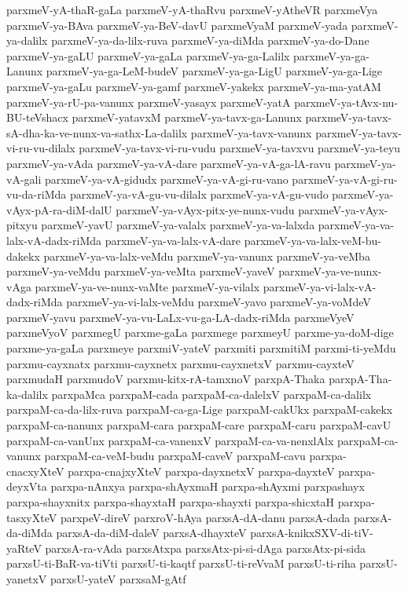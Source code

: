 {parxmeV-yA-thaR-gaLa
parxmeV-yA-thaRvu
parxmeV-yAtheVR
parxmeVya
parxmeV-ya-BAva
parxmeV-ya-BeV-davU
parxmeVyaM
parxmeV-yada
parxmeV-ya-dalilx
parxmeV-ya-da-lilx-ruva
parxmeV-ya-diMda
parxmeV-ya-do-Dane
parxmeV-ya-gaLU
parxmeV-ya-gaLa
parxmeV-ya-ga-Lalilx
parxmeV-ya-ga-Lanunx
parxmeV-ya-ga-LeM-budeV
parxmeV-ya-ga-LigU
parxmeV-ya-ga-Lige
parxmeV-ya-gaLu
parxmeV-ya-gamf
parxmeV-yakekx
parxmeV-ya-ma-yatAM
parxmeV-ya-rU-pa-vanunx
parxmeV-yasayx
parxmeV-yatA
parxmeV-ya-tAvx-nu-BU-teVshacx
parxmeV-yatavxM
parxmeV-ya-tavx-ga-Lanunx
parxmeV-ya-tavx-sA-dha-ka-ve-nunx-va-sathx-La-dalilx
parxmeV-ya-tavx-vanunx
parxmeV-ya-tavx-vi-ru-vu-dilalx
parxmeV-ya-tavx-vi-ru-vudu
parxmeV-ya-tavxvu
parxmeV-ya-teyu
parxmeV-ya-vAda
parxmeV-ya-vA-dare
parxmeV-ya-vA-ga-lA-ravu
parxmeV-ya-vA-gali
parxmeV-ya-vA-gidudx
parxmeV-ya-vA-gi-ru-vano
parxmeV-ya-vA-gi-ru-vu-da-riMda
parxmeV-ya-vA-gu-vu-dilalx
parxmeV-ya-vA-gu-vudo
parxmeV-ya-vAyx-pA-ra-diM-dalU
parxmeV-ya-vAyx-pitx-ye-nunx-vudu
parxmeV-ya-vAyx-pitxyu
parxmeV-yavU
parxmeV-ya-valalx
parxmeV-ya-va-lalxda
parxmeV-ya-va-lalx-vA-dadx-riMda
parxmeV-ya-va-lalx-vA-dare
parxmeV-ya-va-lalx-veM-bu-dakekx
parxmeV-ya-va-lalx-veMdu
parxmeV-ya-vanunx
parxmeV-ya-veMba
parxmeV-ya-veMdu
parxmeV-ya-veMta
parxmeV-yaveV
parxmeV-ya-ve-nunx-vAga
parxmeV-ya-ve-nunx-vaMte
parxmeV-ya-vilalx
parxmeV-ya-vi-lalx-vA-dadx-riMda
parxmeV-ya-vi-lalx-veMdu
parxmeV-yavo
parxmeV-ya-voMdeV
parxmeV-yavu
parxmeV-ya-vu-LaLx-vu-ga-LA-dadx-riMda
parxmeVyeV
parxmeVyoV
parxmegU
parxme-gaLa
parxmege
parxmeyU
parxme-ya-doM-dige
parxme-ya-gaLa
parxmeye
parxmiV-yateV
parxmiti
parxmitiM
parxmi-ti-yeMdu
parxmu-cayxnatx
parxmu-cayxnetx
parxmu-cayxnetxV
parxmu-cayxteV
parxmudaH
parxmudoV
parxmu-kitx-rA-tamxnoV
parxpA-Thaka
parxpA-Tha-ka-dalilx
parxpaMca
parxpaM-cada
parxpaM-ca-dalelxV
parxpaM-ca-dalilx
parxpaM-ca-da-lilx-ruva
parxpaM-ca-ga-Lige
parxpaM-cakUkx
parxpaM-cakekx
parxpaM-ca-nanunx
parxpaM-cara
parxpaM-care
parxpaM-caru
parxpaM-cavU
parxpaM-ca-vanUnx
parxpaM-ca-vanenxV
parxpaM-ca-va-nenxlAlx
parxpaM-ca-vanunx
parxpaM-ca-veM-budu
parxpaM-caveV
parxpaM-cavu
parxpa-cnacxyXteV
parxpa-cnajxyXteV
parxpa-dayxnetxV
parxpa-dayxteV
parxpa-deyxVta
parxpa-nAnxya
parxpa-shAyxmaH
parxpa-shAyxmi
parxpashayx
parxpa-shayxnitx
parxpa-shayxtaH
parxpa-shayxti
parxpa-shicxtaH
parxpa-tasxyXteV
parxpeV-direV
parxroV-hAya
parxsA-dA-danu
parxsA-dada
parxsA-da-diMda
parxsA-da-diM-daleV
parxsA-dhayxteV
parxsA-knikxSXV-di-tiV-yaRteV
parxsA-ra-vAda
parxsAtxpa
parxsAtx-pi-si-dAga
parxsAtx-pi-sida
parxsU-ti-BaR-va-tiVti
parxsU-ti-kaqtf
parxsU-ti-reVvaM
parxsU-ti-riha
parxsU-yanetxV
parxsU-yateV
parxsaM-gAtf
}

